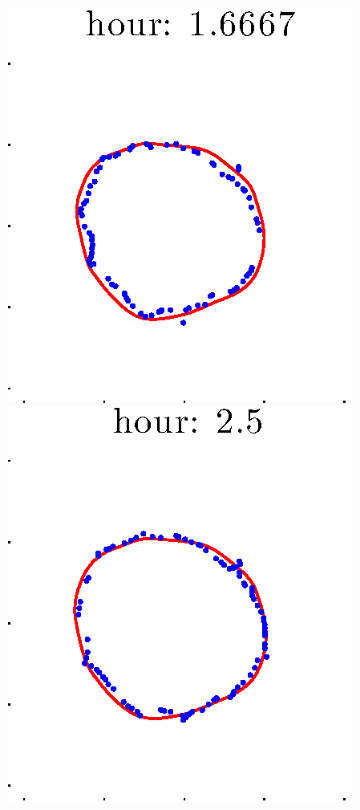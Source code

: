 \documentclass[12pt]{article}
\begin{document}
\begin{figure}[h!]
\begin{subfigure}[b]{.3\textwidth}
		\includegraphics[height=.15\textheight]{Pos5exp2/secondhalf/second3.eps}
		\includegraphics[height=.15\textheight]{Pos5exp2/secondhalf/second4.eps}

\end{subfigure}
\end{figure}
\end{document}
